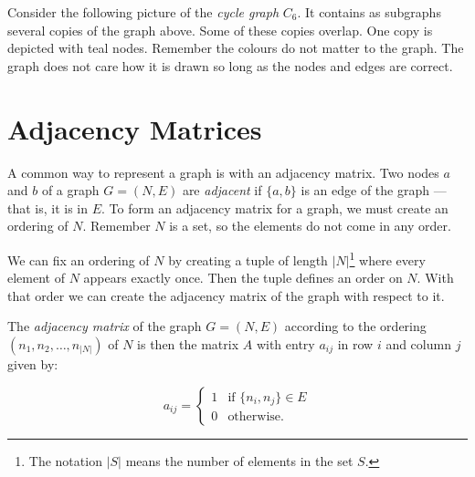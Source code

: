 \documentclass{iansnotes}
\begin{document}
  Consider the following picture of the \emph{cycle graph} $C_6$.
  It contains as subgraphs several copies of the graph above.
  Some of these copies overlap.
  One copy is depicted with teal nodes.
  Remember the colours do not matter to the graph.
  The graph does not care how it is drawn so long as the nodes and edges are correct.
  \begin{center}
  \end{center}

\section{Adjacency Matrices}
  A common way to represent a graph is with an adjacency matrix.
  Two nodes $a$ and $b$ of a graph $G = (N, E)$ are \emph{adjacent} if $\{a,b\}$ is an edge of the graph --- that is, it is in $E$.
  To form an adjacency matrix for a graph, we must create an ordering of $N$.
  Remember $N$ is a set, so the elements do not come in any order.
  
  We can fix an ordering of $N$ by creating a tuple of length $|N|$\footnote{The notation $|S|$ means the number of elements in the set $S$.} where every element of $N$ appears exactly once.
  Then the tuple defines an order on $N$.
  With that order we can create the adjacency matrix of the graph with respect to it.

  The \emph{adjacency matrix} of the graph $G = (N, E)$ according to the ordering $(n_1, n_2, \ldots, n_{|N|})$ of $N$ is then the matrix $A$ with entry $a_{ij}$ in row $i$ and column $j$ given by:
  
  \[ a_{ij} = \begin{cases} 1 & \text{if } \{n_i, n_j\} \in E \\ 0 & \text{otherwise.} \end{cases}\]
\end{document}
